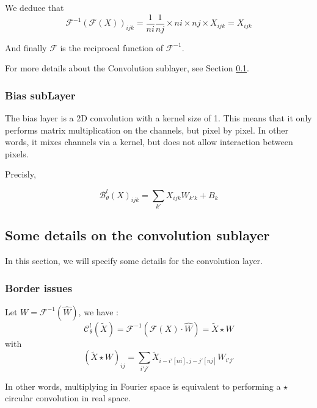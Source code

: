 We deduce that
\begin{equation*}
	\mathcal{F}^{-1}(\mathcal{F}(X))_{ijk} = \frac{1}{ni}\frac{1}{nj} \times ni\times nj\times X_{ijk} = X_{ijk}
\end{equation*}

And finally $\mathcal{F}$ is the reciprocal function of $\mathcal{F}^{-1}$.

For more details about the Convolution sublayer, see Section \ref{FNO.details_conv}.

\subsubsection{Bias subLayer} \label{FNO.bias_sublayer}

The bias layer is a 2D convolution with a kernel size of 1. This means that it only performs matrix multiplication on the channels, but pixel by pixel. In other words, it mixes channels via a kernel, but does not allow interaction between pixels.

Precisly,

\begin{equation*}
	\mathcal{B}_\theta^l(X)_{ijk}=\sum_{k'}X_{ijk}W_{k'k}+B_k
\end{equation*}

\newpage

\subsection{Some details on the convolution sublayer} \label{FNO.details_conv}

In this section, we will specify some details for the convolution layer.

\subsubsection{Border issues}

Let $W=\mathcal{F}^{-1}(\hat{W})$, we have :
\begin{equation*}
	\mathcal{C}_\theta^l(\tilde{X})=\mathcal{F}^{-1}\left(\mathcal{F}(X)\cdot\hat{W}\right)=\tilde{X}\star W
\end{equation*}
with
\begin{equation*}
	(\tilde{X}\star W)_{ij}=\sum_{i'j'}\tilde{X}_{i-i'[ni],j-j'[nj]}W_{i'j'}
\end{equation*}

In other words, multiplying in Fourier space is equivalent to performing a $\star$ circular convolution in real space. 

